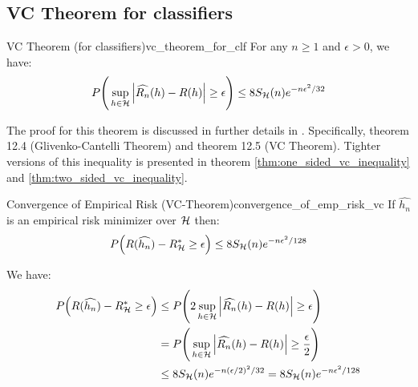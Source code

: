 \subsection{VC Theorem for classifiers}
\begin{theorem}{VC Theorem (for classifiers)}{vc_theorem_for_clf}
    For any $n\ge1$ and $\epsilon>0$, we have:
    \begin{align*}
        P\Bigg( 
            \sup_{h\in\mathcal{H}} \Big| 
                \widehat{R_n}(h) - R(h)
             \Big| \ge \epsilon
         \Bigg) \le 8S_{\mathcal{H}}(n) e^{-n\epsilon^2/32}
    \end{align*}
\end{theorem}

\begin{proof*}
    The proof for this theorem is discussed in further details in \cite{book:devroye}. Specifically, theorem 12.4 (Glivenko-Cantelli Theorem) and theorem 12.5 (VC Theorem). Tighter versions of this inequality is presented in theorem \ref{thm:one_sided_vc_inequality} and \ref{thm:two_sided_vc_inequality}.
\end{proof*}

\begin{corollary}{Convergence of Empirical Risk (VC-Theorem)}{convergence_of_emp_risk_vc}
    If $\widehat{h_n}$ is an empirical risk minimizer over $\mathcal{H}$ then:
    \begin{align*}
        P\Big( 
            R(\widehat{h_n}) - R_{\mathcal{H}}^* \ge \epsilon
         \Big) \le 8S_{\mathcal{H}}(n)e^{-n\epsilon^2/128}
    \end{align*}
\end{corollary}

\begin{proof*}
    We have:
    \begin{align*}
        P\Big( 
            R(\widehat{h_n}) - R_{\mathcal{H}}^* \ge \epsilon
         \Big) 
        &\le 
        P\Bigg( 
            2\sup_{h\in\mathcal{H}} \Big| \widehat{R_n}(h) - R(h) \Big| \ge \epsilon
         \Bigg) \\
        &= 
        P\Bigg( 
            \sup_{h\in\mathcal{H}} \Big| \widehat{R_n}(h) - R(h) \Big| \ge \frac{\epsilon}{2}
         \Bigg) \\
        &\le 8S_{\mathcal{H}}(n)e^{-n(\epsilon/2)^2/32} = 8S_{\mathcal{H}}(n)e^{-n\epsilon^2/128}
    \end{align*}
\end{proof*}


